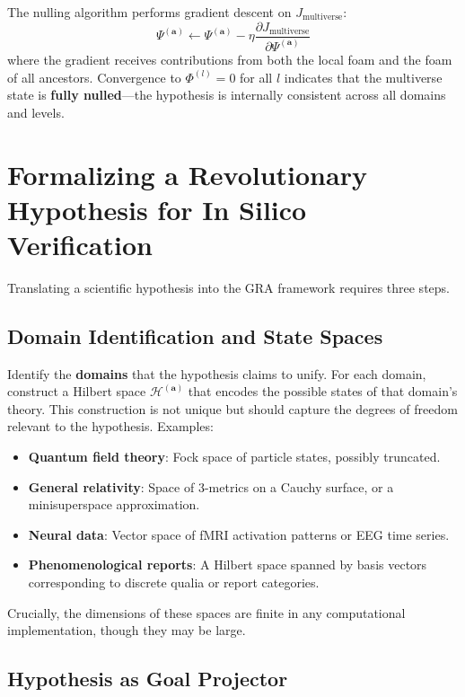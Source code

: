 \documentclass[11pt,a4paper]{article}
\begin{document}
The nulling algorithm performs gradient descent on \(J_{\text{multiverse}}\):
\begin{equation}
\Psi^{(\mathbf{a})} \leftarrow \Psi^{(\mathbf{a})} - \eta \frac{\partial J_{\text{multiverse}}}{\partial \Psi^{(\mathbf{a})}}
\end{equation}
where the gradient receives contributions from both the local foam and the foam of all ancestors. Convergence to \(\Phi^{(l)} = 0\) for all \(l\) indicates that the multiverse state is \textbf{fully nulled}—the hypothesis is internally consistent across all domains and levels.

\section{Formalizing a Revolutionary Hypothesis for In Silico Verification}

Translating a scientific hypothesis into the GRA framework requires three steps.

\subsection{Domain Identification and State Spaces}

Identify the \textbf{domains} that the hypothesis claims to unify. For each domain, construct a Hilbert space \(\mathcal{H}^{(\mathbf{a})}\) that encodes the possible states of that domain's theory. This construction is not unique but should capture the degrees of freedom relevant to the hypothesis. Examples:
\begin{itemize}
    \item \textbf{Quantum field theory}: Fock space of particle states, possibly truncated.
    \item \textbf{General relativity}: Space of 3-metrics on a Cauchy surface, or a minisuperspace approximation.
    \item \textbf{Neural data}: Vector space of fMRI activation patterns or EEG time series.
    \item \textbf{Phenomenological reports}: A Hilbert space spanned by basis vectors corresponding to discrete qualia or report categories.
\end{itemize}
Crucially, the dimensions of these spaces are finite in any computational implementation, though they may be large.

\subsection{Hypothesis as Goal Projector}
\end{document}
